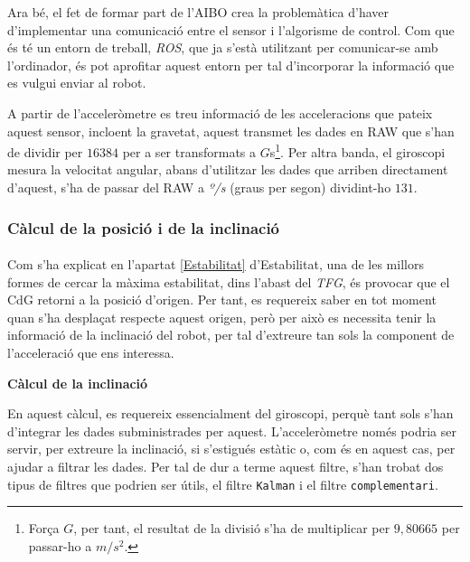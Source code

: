 \documentclass[12pt,a4paper,final,twoside]{article}
\begin{document}

Ara bé, el fet de formar part de l'AIBO crea la problemàtica d'haver d'implementar una comunicació entre el sensor i l'algorisme de control. Com que és té un entorn de treball, \textit{ROS}, que ja s'està utilitzant per comunicar-se amb l'ordinador, és pot aprofitar aquest entorn per tal d'incorporar la informació que es vulgui enviar al robot. 

A partir de l'acceleròmetre es treu informació de les acceleracions que pateix aquest sensor, incloent la gravetat, aquest transmet les dades en RAW que s'han de dividir per $16384$ per a ser transformats a $G$s\footnote{Força $G$, per tant, el resultat de la divisió s'ha de multiplicar per $9,80665$ per passar-ho a $m/s^2$.}. Per altra banda, el giroscopi mesura la velocitat angular, abans d'utilitzar les dades que arriben directament d'aquest, s'ha de passar del RAW a \textit{º/s} (graus per segon) dividint-ho $131$.

\subsubsection{Càlcul de la posició i de la inclinació}
\label{Calcul-posicio-inclinacio}

\paragraph{}Com s'ha explicat en l'apartat \ref{Estabilitat} d'Estabilitat, una de les millors formes de cercar la màxima estabilitat, dins l'abast del \textit{TFG}, és provocar que el CdG retorni a la posició d'origen. Per tant, es requereix saber en tot moment quan s'ha desplaçat respecte aquest origen, però per això es necessita tenir la informació de la inclinació del robot, per tal d'extreure tan sols la component de l'acceleració que ens interessa.


\vspace{20pt}
\textbf{Càlcul de la inclinació}

En aquest càlcul, es requereix essencialment del giroscopi, perquè tant sols s'han d'integrar les dades subministrades per aquest. L'acceleròmetre només podria ser servir, per extreure la inclinació, si s'estigués estàtic o, com és en aquest cas, per ajudar a filtrar les dades. Per tal de dur a terme aquest filtre, s'han trobat dos tipus de filtres que podrien ser útils, el filtre \texttt{Kalman} i el filtre \texttt{complementari}.
\end{document}
